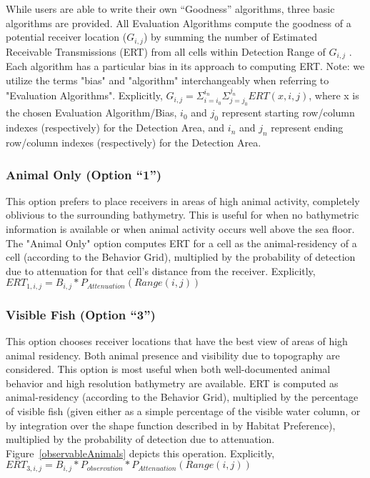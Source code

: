 While users are able to write their own “Goodness” algorithms, three basic algorithms are provided.  All Evaluation Algorithms compute the goodness of a potential receiver location ($G_{i,j}$) by summing the number of Estimated Receivable Transmissions (ERT) from all cells within Detection Range of $G_{i,j}$ .  Each algorithm has a particular bias in its approach to computing ERT.  Note: we utilize the terms "bias" and "algorithm" interchangeably when referring to "Evaluation Algorithms".\newline\newline
Explicitly, $G_{i,j} = \Sigma_{i=i_0}^{i_n} \Sigma_{j=j_0}^{j_n} ERT(x,i,j)$, where x is the chosen Evaluation Algorithm/Bias, $i_0$ and $j_0$ represent starting row/column indexes (respectively) for the Detection Area, and $i_n$ and $j_n$ represent ending row/column indexes (respectively) for the Detection Area.

\subsubsection{Animal Only (Option “1”)}
\label{bias1}
This option prefers to place receivers in areas of high animal activity, completely oblivious to the surrounding bathymetry.  This is useful for when no bathymetric information is available or when animal activity occurs well above the sea floor.   The "Animal Only" option computes ERT for a cell as the animal-residency of a cell (according to the Behavior Grid), multiplied by the probability of detection due to attenuation for that cell's distance from the receiver.\newline
Explicitly,
$ERT_{1,i,j} = B_{i,j} * P_{Attenuation}(Range(i,j))$

\subsubsection{Visible Fish (Option “3”)}
\label{bias3}
This option chooses receiver locations that have the best view of areas of high animal residency.  Both animal presence and visibility due to topography are considered. This option is most useful when both well-documented animal behavior and high resolution bathymetry are available.  ERT is computed as animal-residency (according to the Behavior Grid), multiplied by the percentage of visible fish (given either as a simple percentage of the visible water column, or by integration over the shape function described in by Habitat Preference), multiplied by the probability of detection due to attenuation.  Figure~\ref{observableAnimals} depicts this operation.\newline
Explicitly,
$ERT_{3,i,j} =  B_{i,j} * P_{observation} * P_{Attenuation}(Range(i,j))$

